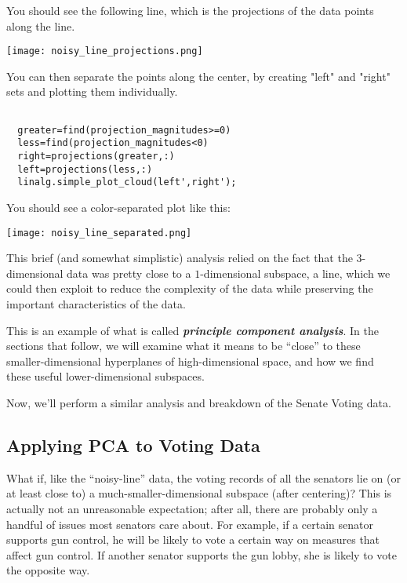 \documentclass{ximera}
\begin{document}
You should see the following line, which is the projections of the data points along the line.

\begin{center}
  \texttt{[image: noisy\_line\_projections.png]}
\end{center}

You can then separate the points along the center, by creating "left" and "right" sets and plotting them individually.

\begin{verbatim}

  greater=find(projection_magnitudes>=0)
  less=find(projection_magnitudes<0)
  right=projections(greater,:)
  left=projections(less,:)
  linalg.simple_plot_cloud(left',right');

\end{verbatim}

You should see a color-separated plot like this:

\begin{center}
  \texttt{[image: noisy\_line\_separated.png]}
\end{center}

This brief (and somewhat simplistic) analysis relied on the fact that the $3$-dimensional data was pretty close to a $1$-dimensional subspace, a line, which we could then exploit to reduce the complexity of the data while preserving the important characteristics of the data. 

This is an example of what is called {\bf \emph{principle component analysis}}. In the sections that follow, we will examine what it means to be ``close'' to these smaller-dimensional hyperplanes of high-dimensional space, and how we find these useful lower-dimensional subspaces. 

Now, we'll perform a similar analysis and breakdown of the Senate Voting data.

\subsection*{Applying PCA to Voting Data}

What if, like the ``noisy-line'' data,
the voting records of all the senators lie on (or at least close to) a
much-smaller-dimensional subspace (after centering)? This is actually not an
unreasonable expectation; after all, there are probably only a handful
of issues most senators care about. For example, if a certain senator
supports gun control, he will be likely to vote a certain way on
measures that affect gun control. If another senator supports the gun
lobby, she is likely to vote the opposite way.
\end{document}
